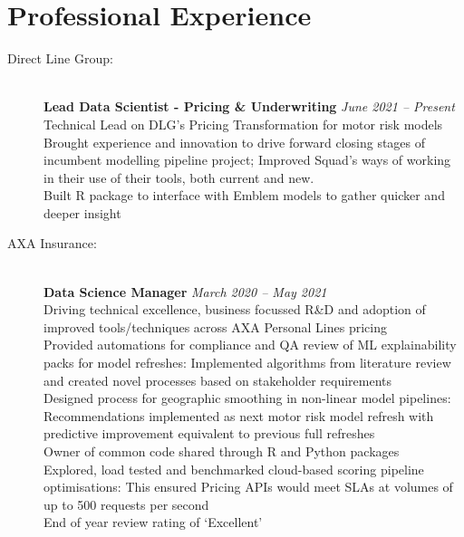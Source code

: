 \documentclass[11pt]{article}
\begin{document}
\section*{Professional Experience}
\begin{description}

\item[Direct Line Group:] \hspace{1mm}\\
\textbf{Lead Data Scientist - Pricing \& Underwriting} \emph{June 2021 -- Present} \\
\textbullet \quad Technical Lead on DLG's Pricing Transformation for motor risk models\\
\textbullet \quad Brought experience and innovation to drive forward closing stages of incumbent modelling pipeline project; Improved Squad's ways of working in their use of their tools, both current and new.\\
\textbullet \quad Built R package to interface with Emblem models to gather quicker and deeper insight\\

\item[AXA Insurance:] \hspace{1mm} \\
\textbf{Data Science Manager} \emph{March 2020 -- May 2021}\\
\textbullet \quad Driving technical excellence, business focussed R\&D and adoption of improved tools/techniques across AXA Personal Lines pricing \\
\textbullet \quad Provided automations for compliance and QA review of ML explainability packs for model refreshes: Implemented algorithms from literature review and created novel processes based on stakeholder requirements \\
\textbullet \quad Designed process for geographic smoothing in non-linear model pipelines: Recommendations implemented as next motor risk model refresh with predictive improvement equivalent to previous full refreshes\\
\textbullet \quad Owner of common code shared through R and Python packages \\
\textbullet \quad Explored, load tested and benchmarked cloud-based scoring pipeline optimisations: This ensured Pricing APIs would meet SLAs at volumes of up to 500 requests per second \\
\textbullet \quad End of year review rating of `Excellent'


\end{description}
\end{document}
